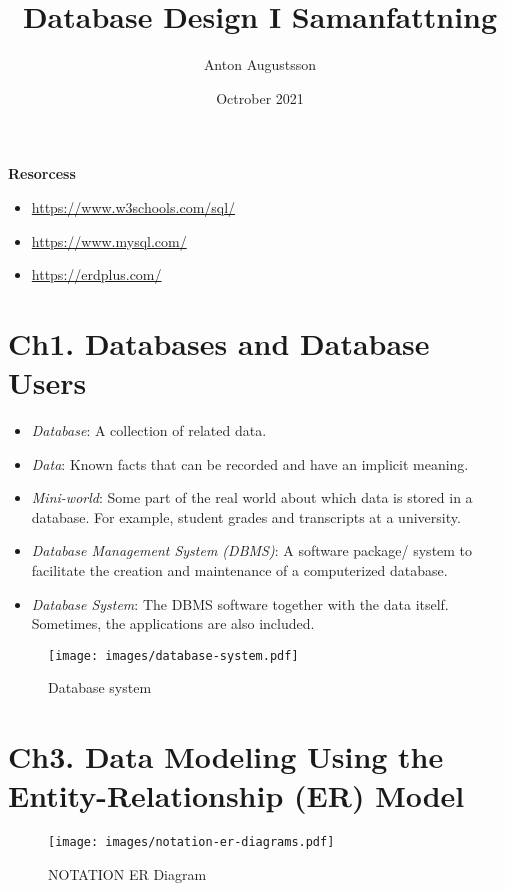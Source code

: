 \documentclass{article}
\title{Database Design I Samanfattning}
\author{Anton Augustsson}
\date{Octrober 2021}
\begin{document}
\maketitle
\newpage
\tableofcontents
\newpage

\textbf{Resorcess}
\begin{itemize}
    \item \url{https://www.w3schools.com/sql/}
    \item \url{https://www.mysql.com/}
    \item \url{https://erdplus.com/}
\end{itemize}


\newpage
\section{Ch1. Databases and Database Users}
\begin{itemize}
    \item \textit{Database}: A collection of related data.
    \item \textit{Data}: Known facts that can be recorded and have an implicit meaning.
    \item \textit{Mini-world}: Some part of the real world about which data is stored 
    in a database. For example, student grades and transcripts at a university.
    \item \textit{Database Management System (DBMS)}: A software package/ system to 
    facilitate the creation and maintenance of a computerized database.
    \item \textit{Database System}: The DBMS software together with the data itself. 
    Sometimes, the applications are also included.
\end{itemize}

\begin{figure}[!h]
    \centering
    \texttt{[image: images/database-system.pdf]}
    \caption{Database system}
\end{figure}

\newpage
\section{Ch3. Data Modeling Using the Entity-Relationship (ER) Model}
\begin{figure}[!h]
    \centering
    \texttt{[image: images/notation-er-diagrams.pdf]}
    \caption{NOTATION ER Diagram}
\end{figure}
\end{document}
